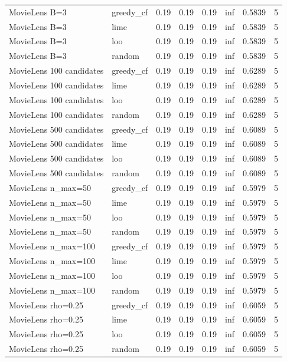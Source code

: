 \begin{table}[t]
{\begin{tabular}{llrrrrrr}
MovieLens B=3 & greedy\_cf & 0.19 & 0.19 & 0.19 & inf & 0.5839 & 5 \\
MovieLens B=3 & lime & 0.19 & 0.19 & 0.19 & inf & 0.5839 & 5 \\
MovieLens B=3 & loo & 0.19 & 0.19 & 0.19 & inf & 0.5839 & 5 \\
MovieLens B=3 & random & 0.19 & 0.19 & 0.19 & inf & 0.5839 & 5 \\
MovieLens 100 candidates & greedy\_cf & 0.19 & 0.19 & 0.19 & inf & 0.6289 & 5 \\
MovieLens 100 candidates & lime & 0.19 & 0.19 & 0.19 & inf & 0.6289 & 5 \\
MovieLens 100 candidates & loo & 0.19 & 0.19 & 0.19 & inf & 0.6289 & 5 \\
MovieLens 100 candidates & random & 0.19 & 0.19 & 0.19 & inf & 0.6289 & 5 \\
MovieLens 500 candidates & greedy\_cf & 0.19 & 0.19 & 0.19 & inf & 0.6089 & 5 \\
MovieLens 500 candidates & lime & 0.19 & 0.19 & 0.19 & inf & 0.6089 & 5 \\
MovieLens 500 candidates & loo & 0.19 & 0.19 & 0.19 & inf & 0.6089 & 5 \\
MovieLens 500 candidates & random & 0.19 & 0.19 & 0.19 & inf & 0.6089 & 5 \\
MovieLens n\_max=50 & greedy\_cf & 0.19 & 0.19 & 0.19 & inf & 0.5979 & 5 \\
MovieLens n\_max=50 & lime & 0.19 & 0.19 & 0.19 & inf & 0.5979 & 5 \\
MovieLens n\_max=50 & loo & 0.19 & 0.19 & 0.19 & inf & 0.5979 & 5 \\
MovieLens n\_max=50 & random & 0.19 & 0.19 & 0.19 & inf & 0.5979 & 5 \\
MovieLens n\_max=100 & greedy\_cf & 0.19 & 0.19 & 0.19 & inf & 0.5979 & 5 \\
MovieLens n\_max=100 & lime & 0.19 & 0.19 & 0.19 & inf & 0.5979 & 5 \\
MovieLens n\_max=100 & loo & 0.19 & 0.19 & 0.19 & inf & 0.5979 & 5 \\
MovieLens n\_max=100 & random & 0.19 & 0.19 & 0.19 & inf & 0.5979 & 5 \\
MovieLens rho=0.25 & greedy\_cf & 0.19 & 0.19 & 0.19 & inf & 0.6059 & 5 \\
MovieLens rho=0.25 & lime & 0.19 & 0.19 & 0.19 & inf & 0.6059 & 5 \\
MovieLens rho=0.25 & loo & 0.19 & 0.19 & 0.19 & inf & 0.6059 & 5 \\
MovieLens rho=0.25 & random & 0.19 & 0.19 & 0.19 & inf & 0.6059 & 5 \\
\bottomrule
\end{tabular}
}
\end{table}
